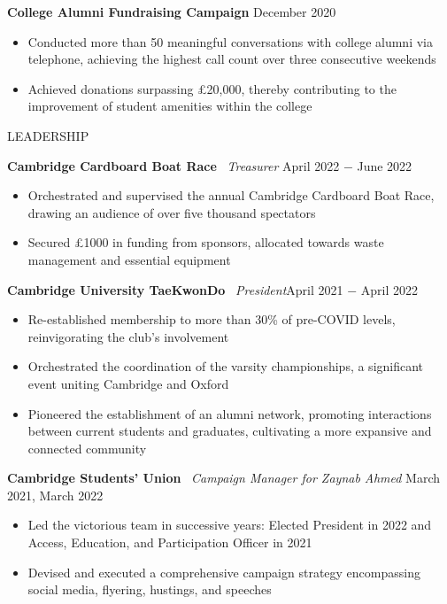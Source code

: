 \documentclass{article}
\begin{document}
\textbf{College Alumni Fundraising Campaign} \hfill December 2020
\begin{itemize}
    \item Conducted more than 50 meaningful conversations with college alumni via telephone, achieving the highest call count over three consecutive weekends
    \item Achieved donations surpassing £20,000, thereby contributing to the improvement of student amenities within the college
\end{itemize} \medskip

\uppercase{Leadership}

\textbf{Cambridge Cardboard Boat Race} \
\textit{Treasurer} \hfill April 2022 $-$ June 2022
\begin{itemize}
    \item Orchestrated and supervised the annual Cambridge Cardboard Boat Race, drawing an audience of over five thousand spectators
    \item Secured £1000 in funding from sponsors, allocated towards waste management and essential equipment
\end{itemize} \medskip

\textbf{Cambridge University TaeKwonDo} \
\textit{President}\hfill April 2021 $-$ April 2022
\begin{itemize}
    \item Re-established membership to more than 30\% of pre-COVID levels, reinvigorating the club's involvement
    \item Orchestrated the coordination of the varsity championships, a significant event uniting Cambridge and Oxford
    \item Pioneered the establishment of an alumni network, promoting interactions between current students and graduates, cultivating a more expansive and connected community
\end{itemize} \medskip

\textbf{Cambridge Students' Union} \
\textit{Campaign Manager for Zaynab Ahmed} \hfill March 2021, March 2022
\begin{itemize}
    \item Led the victorious team in successive years: Elected President in 2022 and Access, Education, and Participation Officer in 2021
    \item Devised and executed a comprehensive campaign strategy encompassing social media, flyering, hustings, and speeches
\end{itemize} \medskip
\end{document}
